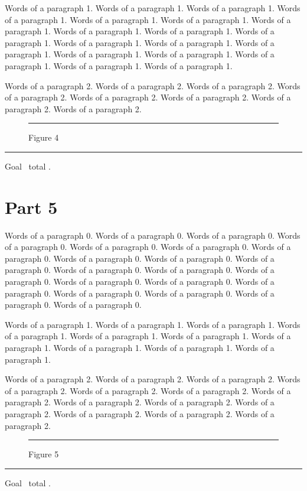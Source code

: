 \documentclass{article}
\begin{document}
Words of a paragraph 1. Words of a paragraph 1. Words of a paragraph 1. Words of a paragraph 1. Words of a paragraph 1. Words of a paragraph 1. Words of a paragraph 1. Words of a paragraph 1. Words of a paragraph 1. Words of a paragraph 1. Words of a paragraph 1. Words of a paragraph 1. Words of a paragraph 1. Words of a paragraph 1. Words of a paragraph 1. Words of a paragraph 1. Words of a paragraph 1. Words of a paragraph 1. 

Words of a paragraph 2. Words of a paragraph 2. Words of a paragraph 2. Words of a paragraph 2. Words of a paragraph 2. Words of a paragraph 2. Words of a paragraph 2. Words of a paragraph 2. 

\begin{figure}[htbp]\centering\rule{180pt}{68pt}\caption{Figure 4}\end{figure}
\noindent\rule{\linewidth}{0.4pt}\par Goal \the\pagegoal\ total \the\pagetotal.

\section{Part 5}
Words of a paragraph 0. Words of a paragraph 0. Words of a paragraph 0. Words of a paragraph 0. Words of a paragraph 0. Words of a paragraph 0. Words of a paragraph 0. Words of a paragraph 0. Words of a paragraph 0. Words of a paragraph 0. Words of a paragraph 0. Words of a paragraph 0. Words of a paragraph 0. Words of a paragraph 0. Words of a paragraph 0. Words of a paragraph 0. Words of a paragraph 0. Words of a paragraph 0. Words of a paragraph 0. Words of a paragraph 0. 

Words of a paragraph 1. Words of a paragraph 1. Words of a paragraph 1. Words of a paragraph 1. Words of a paragraph 1. Words of a paragraph 1. Words of a paragraph 1. Words of a paragraph 1. Words of a paragraph 1. Words of a paragraph 1. 

Words of a paragraph 2. Words of a paragraph 2. Words of a paragraph 2. Words of a paragraph 2. Words of a paragraph 2. Words of a paragraph 2. Words of a paragraph 2. Words of a paragraph 2. Words of a paragraph 2. Words of a paragraph 2. Words of a paragraph 2. Words of a paragraph 2. Words of a paragraph 2. 

\begin{figure}[tp]\centering\rule{200pt}{105pt}\caption{Figure 5}\end{figure}
\noindent\rule{\linewidth}{0.4pt}\par Goal \the\pagegoal\ total \the\pagetotal.
\end{document}
